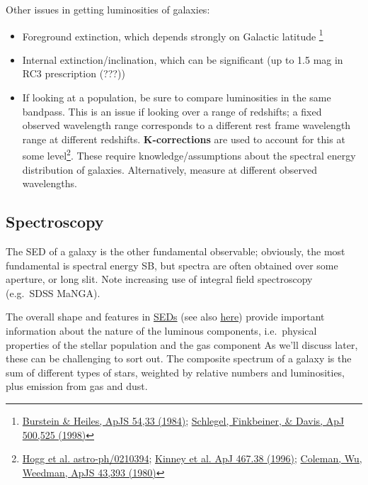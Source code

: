 \documentclass{article}
\newcommand{\mynotes}[1]{\textcolor{cadmiumorange}{#1}}
\begin{document}
Other issues in getting luminosities of galaxies:
\begin{itemize}
    \item Foreground extinction, which depends strongly on Galactic
        latitude
        \footnote{\href{http://adsabs.harvard.edu/cgi-bin/nph-bib_query?bibcode=1984ApJS...54...33B}
            {Burstein \& Heiles, ApJS 54,33 (1984)};
            \href{http://adsabs.harvard.edu/cgi-bin/nph-bib_query?bibcode=1998ApJ...500..525S}
        {Schlegel, Finkbeiner, \& Davis, ApJ 500,525 (1998)}}
    \item Internal extinction/inclination, which can be significant
        (up to 1.5 mag in RC3 prescription \mynotes{(???)})
    \item If looking at a population, be sure to compare luminosities in
        the same bandpass. This is an issue if looking over a range of
        redshifts; a fixed observed wavelength range corresponds to a
        different rest frame wavelength range at different redshifts.
        \textbf{K-corrections} are used to account for this at some
        level\footnote{\href{http://arxiv.org/abs/astro-ph/0210394}
            {Hogg et al. astro-ph/0210394};
            \href{http://adsabs.harvard.edu/cgi-bin/nph-bib_query?bibcode=1996ApJ...467...38K}
            {Kinney et al. ApJ 467.38 (1996)};
            \href{http://adsabs.harvard.edu/cgi-bin/nph-bib_query?bibcode=1980ApJS...43..393C}
            {Coleman, Wu, Weedman, ApJS 43,393 (1980)}}.
        These require knowledge/assumptions about the spectral energy
        distribution of galaxies. Alternatively, measure at different
        observed wavelengths.
\end{itemize}

\subsection{Spectroscopy}
The SED of a galaxy is the other fundamental observable; obviously,
the most fundamental is spectral energy SB, but spectra are often
obtained over some aperture, or long slit. Note
increasing use of integral field spectroscopy (e.g.\ SDSS MaNGA).

The overall shape and features in \href{http://astronomy.nmsu.edu/holtz/a555/resources/galaxyspectra.gif}
{SEDs} (see also \href{http://astronomy.nmsu.edu/nicole/teaching/ASTR505/lectures/quickview.html}
{here}) provide important information
about the nature of the luminous components, i.e.\ physical properties
of the stellar population and the gas component
As we'll discuss later, these can be challenging to sort out.
The composite spectrum of a galaxy is the sum of different types of
stars, weighted by relative numbers and luminosities, plus emission
from gas and dust.
\end{document}
